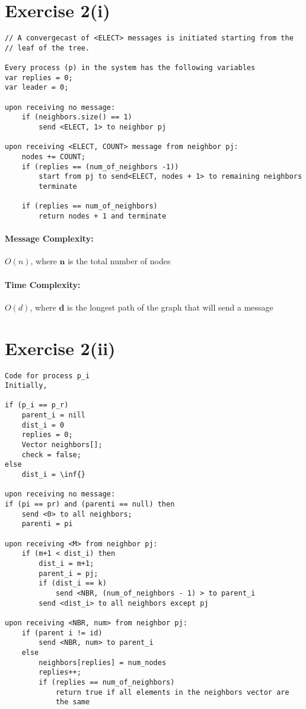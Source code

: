 \section*{Exercise 2(i)}

\begin{lstlisting}[style=mycode]
// A convergecast of <ELECT> messages is initiated starting from the
// leaf of the tree.

Every process (p) in the system has the following variables
var replies = 0;
var leader = 0;

upon receiving no message:
	if (neighbors.size() == 1)
		send <ELECT, 1> to neighbor pj

upon receiving <ELECT, COUNT> message from neighbor pj:
	nodes += COUNT;
	if (replies == (num_of_neighbors -1))
		start from pj to send<ELECT, nodes + 1> to remaining neighbors
		terminate

	if (replies == num_of_neighbors)
		return nodes + 1 and terminate
\end{lstlisting}

\paragraph{Message Complexity:} $O(n)$, where $\textbf{n}$ is the
total number of nodes
\paragraph{Time Complexity:} $O(d)$, where ${\textbf{d}}$ is the
longest path of the graph that will send a message

\section*{Exercise 2(ii)}

\begin{lstlisting}[style=mycode]
Code for process p_i
Initially, 

if (p_i == p_r)
	parent_i = nill
	dist_i = 0 
	replies = 0;
	Vector neighbors[];
	check = false;
else
	dist_i = \inf{}

upon receiving no message:
if (pi == pr) and (parenti == null) then
	send <0> to all neighbors;
	parenti = pi

upon receiving <M> from neighbor pj:
	if (m+1 < dist_i) then
		dist_i = m+1;
		parent_i = pj;
		if (dist_i == k)
			send <NBR, (num_of_neighbors - 1) > to parent_i
		send <dist_i> to all neighbors except pj

upon receiving <NBR, num> from neighbor pj:
	if (parent i != id)
		send <NBR, num> to parent_i
	else
		neighbors[replies] = num_nodes
		replies++;
		if (replies == num_of_neighbors)
			return true if all elements in the neighbors vector are
			the same
\end{lstlisting}

